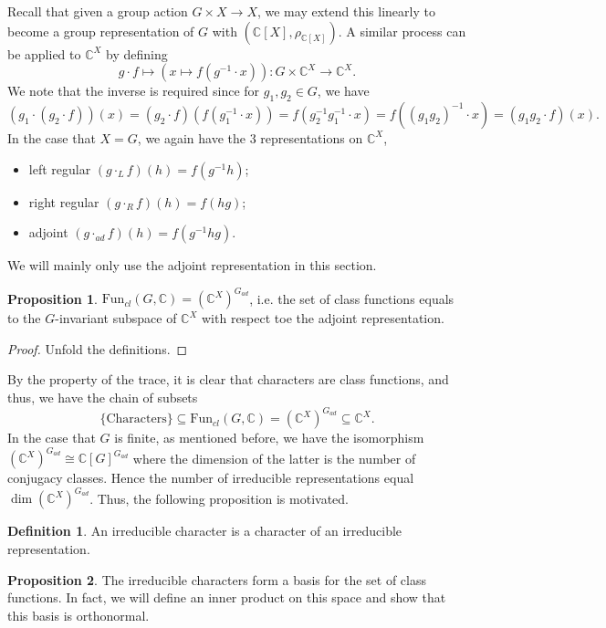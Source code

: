 \documentclass[]{article}
\theoremstyle{definition}
\theoremstyle{definition}
\newtheorem{definition}{Definition}[section]
\newtheorem{proposition}{Proposition}[section]
\begin{document}
Recall that given a group action \(G \times X \to X\), we may extend this 
linearly to become a group representation of \(G\) with 
\((\mathbb{C}[X], \rho_{\mathbb{C}[X]})\). A similar process can be applied 
to \(\mathbb{C}^X\) by defining 
\[g \cdot f \mapsto (x \mapsto f(g^{-1} \cdot x)) : 
  G \times \mathbb{C}^X \to \mathbb{C}^X.\]
We note that the inverse is required since for \(g_1, g_2 \in G\), we have 
\[(g_1 \cdot (g_2 \cdot f))(x) = (g_2 \cdot f)(f(g_1^{-1} \cdot x)) = 
  f(g_2^{-1} g_1^{-1} \cdot x) = f((g_1 g_2)^{-1} \cdot x) = (g_1 g_2 \cdot f)(x).\]
In the case that \(X = G\), we again have the 3 representations on \(\mathbb{C}^X\),
\begin{itemize}
  \item left regular \((g \cdot_L f)(h) = f(g^{-1} h)\);
  \item right regular \((g \cdot_R f)(h) = f(hg)\);
  \item adjoint \((g \cdot_{ad} f)(h) = f(g^{-1} h g)\).
\end{itemize}
We will mainly only use the adjoint representation in this section. 

\begin{proposition}
  \(\text{Fun}_{cl}(G, \mathbb{C}) = (\mathbb{C}^X)^{G_{ad}}\), i.e. the set of 
  class functions equals to the \(G\)-invariant subspace of \(\mathbb{C}^X\) 
  with respect toe the adjoint representation.
\end{proposition}
\begin{proof}
  Unfold the definitions.
\end{proof}

By the property of the trace, it is clear that characters are class functions,
and thus, we have the chain of subsets 
\[\{\text{Characters}\} \subseteq \text{Fun}_{cl}(G, \mathbb{C}) = 
(\mathbb{C}^X)^{G_{ad}} \subseteq \mathbb{C}^X.\]
In the case that \(G\) is finite, as mentioned before, we have the isomorphism 
\((\mathbb{C}^X)^{G_{ad}} \cong \mathbb{C}[G]^{G_{ad}}\) where the dimension of 
the latter is the number of conjugacy classes. Hence the number of irreducible 
representations equal \(\dim (\mathbb{C}^X)^{G_{ad}}\). Thus, the following 
proposition is motivated.

\begin{definition}
  An irreducible character is a character of an irreducible representation.
\end{definition}

\begin{proposition}
  The irreducible characters form a basis for the set of class functions. 
  In fact, we will define an inner product on this space and show that 
  this basis is orthonormal.
\end{proposition}
\end{document}
